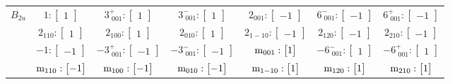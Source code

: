 \documentclass[fleqn,8pt,landscape]{jsarticle}
\begin{document}
\begin{longtable}{ccccccc}
$ B_{2u} $ & $ 1:\begin{bmatrix} 1 \end{bmatrix} $ & $ 3^{+}_{\,\,001}:\begin{bmatrix} 1 \end{bmatrix} $ & $ 3^{-}_{\,\,001}:\begin{bmatrix} 1 \end{bmatrix} $ & $ 2{}_{001}:\begin{bmatrix} -1 \end{bmatrix} $ & $ 6^{-}_{\,\,001}:\begin{bmatrix} -1 \end{bmatrix} $ & $ 6^{+}_{\,\,001}:\begin{bmatrix} -1 \end{bmatrix} $ \\
& $ 2{}_{110}:\begin{bmatrix} 1 \end{bmatrix} $ & $ 2{}_{100}:\begin{bmatrix} 1 \end{bmatrix} $ & $ 2{}_{010}:\begin{bmatrix} 1 \end{bmatrix} $ & $ 2{}_{1-10}:\begin{bmatrix} -1 \end{bmatrix} $ & $ 2{}_{120}:\begin{bmatrix} -1 \end{bmatrix} $ & $ 2{}_{210}:\begin{bmatrix} -1 \end{bmatrix} $ \\
& $ -1:\begin{bmatrix} -1 \end{bmatrix} $ & $ -3^{+}_{\,\,001}:\begin{bmatrix} -1 \end{bmatrix} $ & $ -3^{-}_{\,\,001}:\begin{bmatrix} -1 \end{bmatrix} $ & $ {\rm m}_{001}:\begin{bmatrix} 1 \end{bmatrix} $ & $ -6^{-}_{\,\,001}:\begin{bmatrix} 1 \end{bmatrix} $ & $ -6^{+}_{\,\,001}:\begin{bmatrix} 1 \end{bmatrix} $ \\
& $ {\rm m}_{110}:\begin{bmatrix} -1 \end{bmatrix} $ & $ {\rm m}_{100}:\begin{bmatrix} -1 \end{bmatrix} $ & $ {\rm m}_{010}:\begin{bmatrix} -1 \end{bmatrix} $ & $ {\rm m}_{1-10}:\begin{bmatrix} 1 \end{bmatrix} $ & $ {\rm m}_{120}:\begin{bmatrix} 1 \end{bmatrix} $ & $ {\rm m}_{210}:\begin{bmatrix} 1 \end{bmatrix} $ \\ \hline

\end{longtable}
\end{document}
